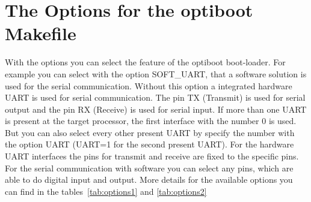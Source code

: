 \section{The Options for the optiboot Makefile}

With the options you can select the feature of the optiboot boot-loader.
For example you can select with the option SOFT\_UART, that a software solution
is used for the serial communication.
Without this option a integrated hardware UART is used for serial communication.
The pin TX (Transmit) is used for serial output and the pin RX (Receive) is used
for serial input. If more than one UART is present at the target processor,
the first interface with the number 0 is used.
But you can also select every other present UART by specify the number with
the option UART (UART=1 for the second present UART).
For the hardware UART interfaces the pins for transmit and receive are fixed
to the specific pins. For the serial communication with software you can
select any pins, which are able to do digital input and output.
More details for the available options you can find in the tables~\ref{tab:options1}
and \ref{tab:options2}

